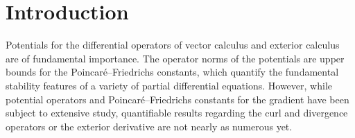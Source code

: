 \documentclass[10pt,letterpaper]{article}
\begin{document}
\tableofcontents
 
\section{Introduction}\label{section:intro}

Potentials for the differential operators of vector calculus and exterior calculus are of fundamental importance.
The operator norms of the potentials are upper bounds for the Poincar\'e--Friedrichs constants, 
which quantify the fundamental stability features of a variety of partial differential equations.
However, while potential operators and Poincar\'e--Friedrichs constants for the gradient have been subject to extensive study, quantifiable results regarding the curl and divergence operators or the exterior derivative are not nearly as numerous yet. 

\end{document}
